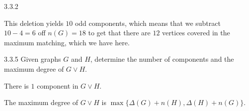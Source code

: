 \documentclass[10pt]{extarticle}
\begin{document}
\begin{problem}{3.3.2}
\begin{center}
    \end{center}
    This deletion yields $10$ odd components, which means that we subtract $10 - 4 = 6$ off $n(G) = 18$ to get that there are $12$ vertices covered in the maximum matching, which we have here.
  \end{problem}
  \begin{problem}{3.3.5}
    Given graphs $G$ and $H$, determine the number of components and the maximum degree of $G\vee H$.
    \tcblower
    \begin{description}[font=\normalfont\scshape]
      \item[Components] There is $1$ component in $G\vee H$.
      \item[Maximum degree] The maximum degree of $G\vee H$ is $\max\{\Delta(G) + n(H),\Delta(H) + n(G)\}$.
    \end{description}
  \end{problem}
\end{document}
